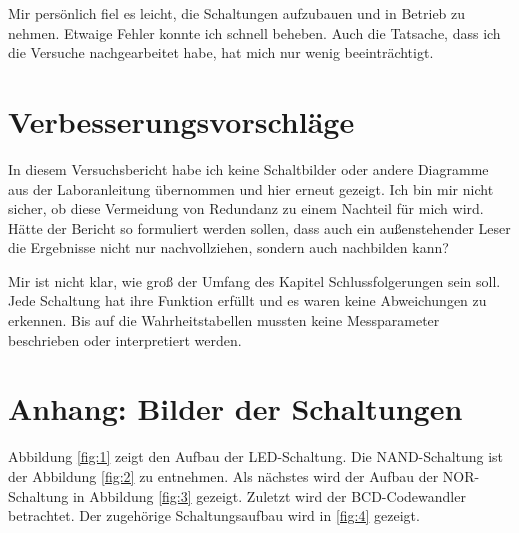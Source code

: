 \documentclass[
    paper=a4,
]{scrartcl}
\newcommand{\quoteenv}[1]{\glqq #1\grqq}
\begin{document}
    Mir persönlich fiel es leicht, die Schaltungen aufzubauen und in Betrieb zu nehmen. Etwaige Fehler konnte ich schnell beheben. Auch die Tatsache, dass ich die Versuche nachgearbeitet habe, hat mich nur wenig beeinträchtigt.

\section{Verbesserungsvorschläge}

    In diesem Versuchsbericht habe ich keine Schaltbilder oder andere Diagramme aus der Laboranleitung übernommen und hier erneut gezeigt. Ich bin mir nicht sicher, ob diese Vermeidung von Redundanz zu einem Nachteil für mich wird. Hätte der Bericht so formuliert werden sollen, dass auch ein außenstehender Leser die Ergebnisse nicht nur nachvollziehen, sondern auch nachbilden kann?

    Mir ist nicht klar, wie groß der Umfang des Kapitel \quoteenv{Schlussfolgerungen} sein soll. Jede Schaltung hat ihre Funktion erfüllt und es waren keine Abweichungen zu erkennen. Bis auf die Wahrheitstabellen mussten keine Messparameter beschrieben oder interpretiert werden.

\appendix

\section{Anhang: Bilder der Schaltungen}
    \label{app:1}

    Abbildung \ref{fig:1} zeigt den Aufbau der LED-Schaltung. Die NAND-Schaltung ist der Abbildung \ref{fig:2} zu entnehmen. Als nächstes wird der Aufbau der NOR-Schaltung in Abbildung \ref{fig:3} gezeigt. Zuletzt wird der BCD-Codewandler betrachtet. Der zugehörige Schaltungsaufbau wird in \ref{fig:4} gezeigt.
\end{document}
